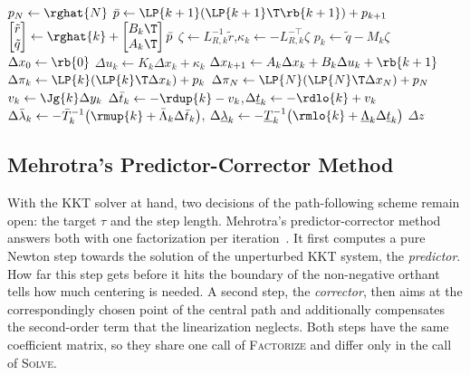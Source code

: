 \begin{algorithm}[H]
\begin{algorithmic}[1]
\EndFor
\State $p_N \gets \rghat{N}$
\State $\bar{p} \gets \LP{k+1}\!\left(\LP{k+1}\T \rb{k+1}\right) + p_{k+1}$
\State $\begin{bmatrix} \tilde r \\ \tilde q \end{bmatrix} \gets \rghat{k} + \begin{bmatrix} B_k\T \\ A_k\T \end{bmatrix} \bar{p}$
\State $\zeta \gets L_{R,k}^{-1} \tilde r$,\quad $\kappa_k \gets -L_{R,k}^{-\top} \zeta$
\State $p_k \gets \tilde q - M_k \zeta$
\EndFor
\State $\Delta x_0 \gets \rb{0}$
\State $\Delta u_k \gets K_k \Delta x_k + \kappa_k$
\State $\Delta x_{k+1} \gets A_k \Delta x_k + B_k \Delta u_k + \rb{k+1}$
\State $\Delta\pi_k \gets \LP{k}\!\left(\LP{k}\T \Delta x_k\right) + p_k$
\EndFor
\State $\Delta\pi_N \gets \LP{N}\!\left(\LP{N}\T \Delta x_N\right) + p_N$
\State $v_k \gets \Jg{k} \Delta y_k$
\State $\Delta\bar{t}_k \gets -\rdup{k} - v_k$,\quad $\Delta\underline{t}_k \gets -\rdlo{k} + v_k$
\State $\Delta\bar{\lambda}_k \gets -\bar{T}_k^{-1}\big(\rmup{k} + \bar{\Lambda}_k \Delta\bar{t}_k\big)$,\quad
       $\Delta\underline{\lambda}_k \gets -\underline{T}_k^{-1}\big(\rmlo{k} + \underline{\Lambda}_k \Delta\underline{t}_k\big)$
\EndFor
\State \Return $\Delta z$
\EndProcedure
\end{algorithmic}
\end{algorithm}

\subsection{Mehrotra's Predictor-Corrector Method}
\label{sec:mehrotra}

With the KKT solver at hand, two decisions of the path-following scheme remain open: the target $\tau$ and the step length.
Mehrotra's predictor-corrector method~\cite{mehrotra1992implementation} answers both with one factorization per iteration~\cite{wright1997primal,nocedal2006numerical}.
It first computes a pure Newton step towards the solution of the unperturbed KKT system, the \textit{predictor}.
How far this step gets before it hits the boundary of the non-negative orthant tells how much centering is needed.
A second step, the \textit{corrector}, then aims at the correspondingly chosen point of the central path and additionally compensates the second-order term that the linearization neglects.
Both steps have the same coefficient matrix, so they share one call of \textsc{Factorize} and differ only in the call of \textsc{Solve}.

